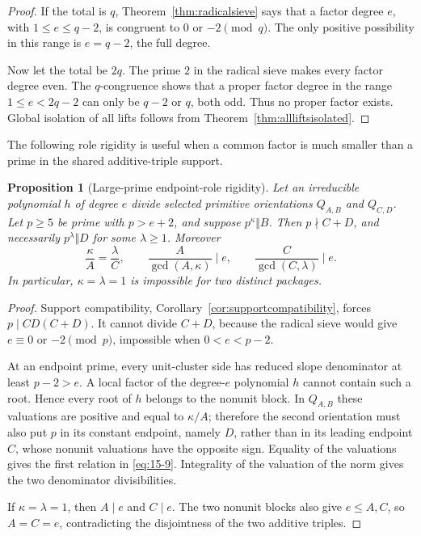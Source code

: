 \documentclass[11pt]{article}
\numberwithin{equation}{section}
\newtheorem{proposition}[theorem]{Proposition}
\theoremstyle{definition}
\begin{document}
\begin{proof}
If the total is \(q\), Theorem~\ref{thm:radicalsieve} says that a factor
degree \(e\), with \(1\leq e\leq q-2\), is congruent to \(0\) or
\(-2\pmod q\).  The only positive possibility in this range is
\(e=q-2\), the full degree.

Now let the total be \(2q\).  The prime \(2\) in the radical sieve makes
every factor degree even.  The \(q\)-congruence shows that a proper factor
degree in the range \(1\leq e<2q-2\) can only be \(q-2\) or \(q\), both
odd.  Thus no proper factor exists.  Global isolation of all lifts follows
from Theorem~\ref{thm:allliftsisolated}.
\end{proof}

The following role rigidity is useful when a common factor is much smaller
than a prime in the shared additive-triple support.

\begin{proposition}[Large-prime endpoint-role rigidity]
\label{prop:largerole}
Let an irreducible polynomial \(h\) of degree \(e\) divide selected
primitive orientations \(Q_{A,B}\) and \(Q_{C,D}\).  Let \(p\geq5\) be
prime with \(p>e+2\), and suppose \(p^\kappa\Vert B\).  Then
\(p\nmid C+D\), and necessarily \(p^\lambda\Vert D\) for some
\(\lambda\geq1\).  Moreover
\begin{equation}
 \frac{\kappa}{A}=\frac{\lambda}{C},
 \qquad
 \frac{A}{\gcd(A,\kappa)}\mid e,
 \qquad
 \frac{C}{\gcd(C,\lambda)}\mid e.
 \label{eq:15-9}
\end{equation}
In particular, \(\kappa=\lambda=1\) is impossible for two distinct
packages.
\end{proposition}

\begin{proof}
Support compatibility, Corollary~\ref{cor:supportcompatibility}, forces
\(p\mid CD(C+D)\).  It cannot divide \(C+D\), because the radical sieve
would give \(e\equiv0\) or \(-2\pmod p\), impossible when
\(0<e<p-2\).

At an endpoint prime, every unit-cluster side has reduced slope denominator
at least \(p-2>e\).  A local factor of the degree-\(e\) polynomial \(h\)
cannot contain such a root.  Hence every root of \(h\) belongs to the
nonunit block.  In \(Q_{A,B}\) these valuations are positive and equal to
\(\kappa/A\); therefore the second orientation must also put \(p\) in its
constant endpoint, namely \(D\), rather than in its leading endpoint
\(C\), whose nonunit valuations have the opposite sign.  Equality of the
valuations gives the first relation in \eqref{eq:15-9}.  Integrality of the
valuation of the norm gives the two denominator divisibilities.

If \(\kappa=\lambda=1\), then \(A\mid e\) and \(C\mid e\).  The two
nonunit blocks also give \(e\leq A,C\), so \(A=C=e\), contradicting the
disjointness of the two additive triples.
\end{proof}
\end{document}
